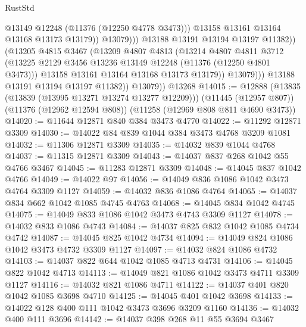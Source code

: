 \begin{lexlean}{RustStd}
\begin{coremodule}
{\begin{coremodule}
{{{{{{{{{{{{{{{{{{{{{{{{{{{{{{{{{{{{{{{{{{{{{{{{{{{{{{{{{{{{{{{{{{{{{{{{{{{{{{{{{{{{{                                @13149
                                @12248
                                (@11376 (@12250 @4778 @3473)))
                              @13158
                              @13161
                              @13164
                              @13168
                              @13173
                              @13179))
                          @13079)))
                    @13188
                    @13191
                    @13194
                    @13197
                    @11382))
                (@13205
                  @4815
                  @3467
                  (@13209
                    @4807
                    @4813
                    (@13214
                      @4807
                      @4811
                      @3712
                      (@13225 @2129 @3456 @13236 @13149 @12248 (@11376 (@12250 @4801 @3473)))
                      @13158
                      @13161
                      @13164
                      @13168
                      @13173
                      @13179))
                  @13079)))
            @13188
            @13191
            @13194
            @13197
            @11382))
        @13079))
    @13268
@14015 := @12888
    (@13835 (@13839 (@13995 @13271 @13274 @13277 @12209)))
    (@11445 (@12957 @807))
    (@11376 (@12962 @12594 @808))
    (@11258 (@12969 @808 @811 @4690 @3473))
@14020 := @11644 @12871 @840 @384 @3473 @4770
@14022 := @11292 @12871 @3309
@14030 := @14022 @84 @839 @1044 @384 @3473 @4768 @3209 @1081
@14032 := @11306 @12871 @3309
@14035 := @14032 @839 @1044 @4768
@14037 := @11315 @12871 @3309
@14043 := @14037 @837 @268 @1042 @55 @4766 @3467
@14045 := @11283 @12871 @3309
@14048 := @14045 @837 @1042 @4766
@14049 := @14022 @97
@14056 := @14049 @836 @1086 @1042 @3473 @4764 @3309 @1127
@14059 := @14032 @836 @1086 @4764
@14065 := @14037 @834 @662 @1042 @1085 @4745 @4763
@14068 := @14045 @834 @1042 @4745
@14075 := @14049 @833 @1086 @1042 @3473 @4743 @3309 @1127
@14078 := @14032 @833 @1086 @4743
@14084 := @14037 @825 @832 @1042 @1085 @4734 @4742
@14087 := @14045 @825 @1042 @4734
@14094 := @14049 @824 @1086 @1042 @3473 @4732 @3309 @1127
@14097 := @14032 @824 @1086 @4732
@14103 := @14037 @822 @644 @1042 @1085 @4713 @4731
@14106 := @14045 @822 @1042 @4713
@14113 := @14049 @821 @1086 @1042 @3473 @4711 @3309 @1127
@14116 := @14032 @821 @1086 @4711
@14122 := @14037 @401 @820 @1042 @1085 @3698 @4710
@14125 := @14045 @401 @1042 @3698
@14133 := @14022 @128 @400 @111 @1042 @3473 @3696 @3209 @1160
@14136 := @14032 @400 @111 @3696
@14142 := @14037 @398 @268 @11 @55 @3694 @3467
}}}}}}}}}}}}}}}}}}}}}}}}}}}}}}}}}}}}}}}}}}}}}}}}}}}}}}}}}}}}}}}}}}}}}}}}}}}}}}}}}}}}}
\end{coremodule}}
\end{coremodule}
\end{lexlean}
